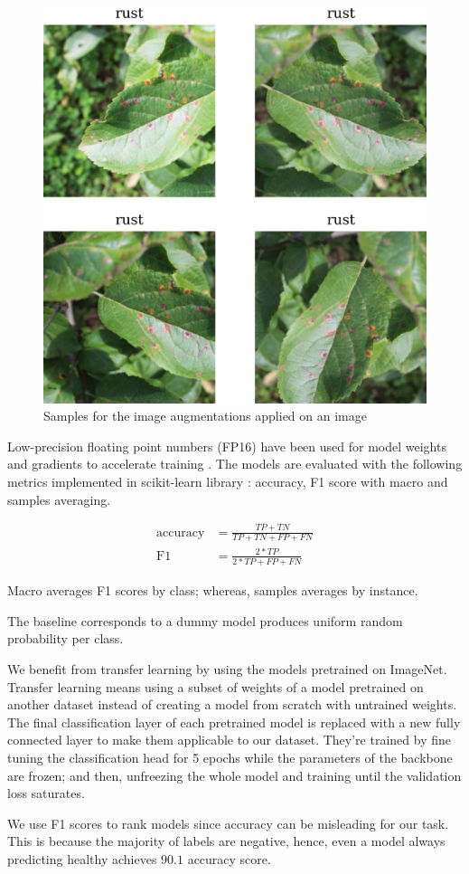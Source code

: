 \documentclass[conference]{IEEEtran}
\begin{document}
\begin{figure}[h]
    \centerline{\includegraphics[width = 0.45 \textwidth]{image-aug-3x3.png}}
    \caption{Samples for the image augmentations applied on an image}
    \label{fig:image-aug}
\end{figure}

Low-precision floating point numbers (FP16) have been used 
for model weights and gradients to accelerate training 
\cite{Micikevicius2018} \cite{BagOfTricks}.
The models are evaluated with the following metrics implemented 
in scikit-learn library \cite{sklearn_api}: 
accuracy, F1 score with macro and samples averaging.

\begin{align*}
    \text{accuracy} &= \frac{TP+TN}{TP+TN+FP+FN} \\
    \text{F1} &= \frac{2*TP}{2*TP+FP+FN}
\end{align*}

Macro averages F1 scores by class; whereas, samples averages by instance.


The baseline corresponds to a dummy model produces uniform random probability per class. 

We benefit from transfer learning by using the models pretrained on ImageNet. Transfer learning
means using a subset of weights of a model pretrained on another dataset instead of 
creating a model from scratch with untrained weights.
The final classification layer of each pretrained model is replaced with a new fully connected layer to make them applicable to our dataset. 
They're trained by fine tuning the classification head for 5 epochs while the parameters 
of the backbone are frozen; and then,
unfreezing the whole model and training until the validation loss saturates.

We use F1 scores to rank models since accuracy can be misleading for our task.
This is because the majority of labels are negative, hence, even a model always predicting 
healthy achieves $90.1$ accuracy score. 
\end{document}
